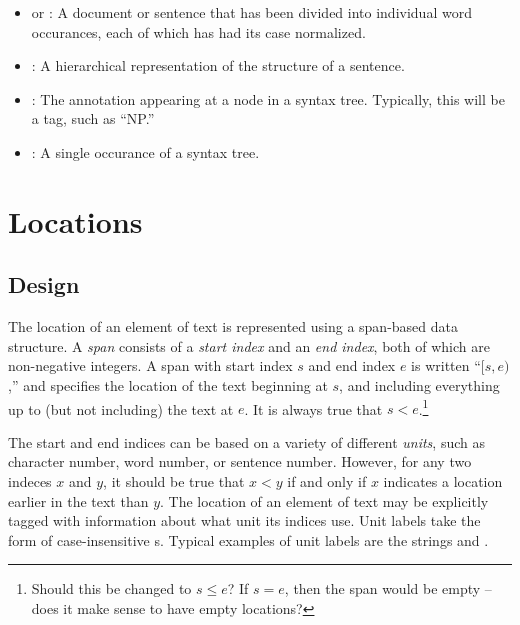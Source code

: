 \documentclass[11pt]{article}
\begin{document}
\begin{itemize}
    \item {} or : A document or sentence that has been divided into
        individual word occurances, each of which has had its case
        normalized.
  
    \item {}: A hierarchical representation of the
        structure of a sentence.
  
    \item {}: The annotation appearing at a node in a
        syntax tree.  Typically, this will be a tag, such as ``NP.''
  
    \item {}: A single occurance of a syntax
        tree.
  
  \end{itemize}

\section{Locations}
\label{sec:locations}

  \subsection{Design}

  The location of an element of text is represented using a span-based
  data structure.  A \emph{span} consists of a \emph{start index} and
  an \emph{end index}, both of which are non-negative integers.  A
  span with start index $s$ and end index $e$ is written ``$[s,e)$,''
  and specifies the location of the text beginning at $s$, and
  including everything up to (but not including) the text at $e$.  It
  is always true that $s<e$.\footnote{Should this be changed to $s\leq
  e$?  If $s=e$, then the span would be empty -- does it make sense to
  have empty locations?}

  The start and end indices can be based on a variety of different
  \emph{units}, such as character number, word number, or sentence
  number.  However, for any two indeces $x$ and $y$, it should be true
  that $x<y$ if and only if $x$ indicates a location earlier in the
  text than $y$.  The location of an element of text may be explicitly
  tagged with information about what unit its indices use.  Unit
  labels take the form of case-insensitive s.  Typical
  examples of unit labels are the strings  and
  .
\end{document}
